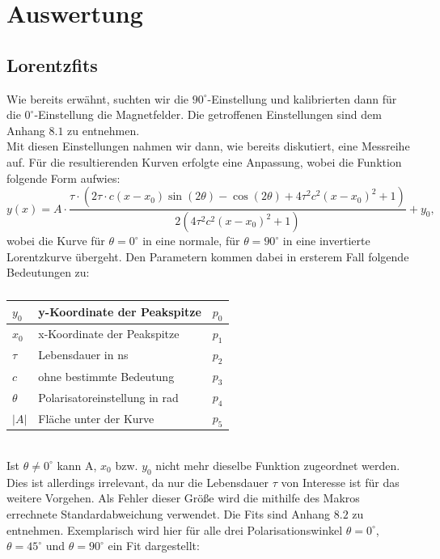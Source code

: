 \newpage
\section{Auswertung}
\subsection{Lorentzfits}
Wie bereits erwähnt, suchten wir die $90^{\circ}$-Einstellung und kalibrierten dann für die $0^{\circ}$-Einstellung die Magnetfelder. Die getroffenen Einstellungen sind dem Anhang $8.1$ zu entnehmen.\\
Mit diesen Einstellungen nahmen wir dann, wie bereits diskutiert, eine Messreihe auf. Für die resultierenden Kurven erfolgte eine Anpassung, wobei die Funktion folgende Form aufwies: \[y(x)=A\cdot\frac{\tau\cdot(2\tau\cdot c(x-x_{0})\sin(2\theta)-\cos(2\theta)+4\tau^{2}c^{2}(x-x_{0})^{2}+1)}{2(4\tau^{2}c^{2}(x-x_{0})^{2}+1)}+y_{0},\] wobei die Kurve für $\theta=0^{\circ}$ in eine normale, für $\theta=90^{\circ}$ in eine invertierte Lorentzkurve übergeht. Den Parametern kommen dabei in ersterem Fall folgende Bedeutungen zu:\\
\begin{table}[htbp]
\begin{center}
\caption{}
\begin{tabular}{|l|l|l|}
\hline
$y_{0}$ & y-Koordinate der Peakspitze & $p_{0}$ \\ \hline
$x_{0}$ & x-Koordinate der Peakspitze & $p_{1}$ \\ \hline
$\tau$ & Lebensdauer in ns & $p_{2}$ \\ \hline
$c$ & ohne bestimmte Bedeutung & $p_{3}$ \\ \hline
$\theta$ & Polarisatoreinstellung in rad & $p_{4}$ \\ \hline
$\left|A\right|$ & Fläche unter der Kurve & $p_{5}$ \\ \hline
\end{tabular}
\label{}{}\end{center}
\end{table}
~\\
Ist $\theta\ne 0^{\circ}$ kann A, $x_{0}$ bzw. $y_{0}$ nicht mehr dieselbe Funktion zugeordnet werden. Dies ist allerdings irrelevant, da nur die Lebensdauer $\tau$ von Interesse ist für das weitere Vorgehen. Als Fehler dieser Größe wird die mithilfe des Makros errechnete Standardabweichung verwendet. Die Fits sind Anhang $8.2$ zu entnehmen. Exemplarisch wird hier für alle drei Polarisationswinkel $\theta=0^{\circ}$, $\theta=45^{\circ}$ und $\theta=90^{\circ}$ ein Fit dargestellt:\\
